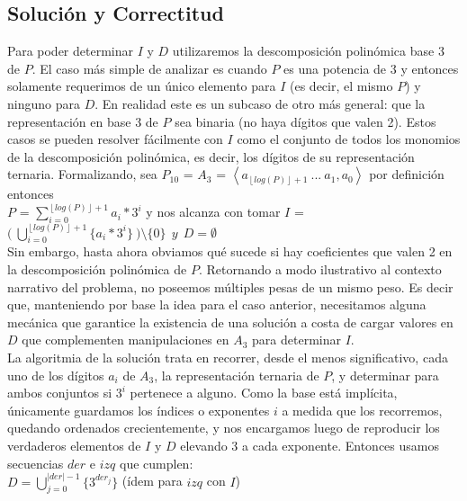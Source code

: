 \subsection{Solución y Correctitud}
	Para poder determinar $I$ y $D$ utilizaremos la descomposición polinómica base 3 de $P$. El caso más simple de analizar es cuando $P$ es una potencia de 3 y entonces solamente requerimos de un único elemento para $I$ (es decir, el mismo $P$) y ninguno para $D$. En realidad este es un subcaso de otro más general: que la representación en base 3 de $P$ sea binaria (no haya dígitos que valen 2). Estos casos se pueden resolver fácilmente con $I$ como el conjunto de todos los monomios de la descomposición polinómica, es decir, los dígitos de su representación ternaria. Formalizando, sea $P_{10}$ = $A_3$ = $\left \langle a_{ \left \lfloor{log(P)}\right \rfloor + 1 } \ ... \ a_1, a_0  \right \rangle$ por definición entonces \\

	$P$ = $\sum_{i = 0}^{\left \lfloor{log(P)}\right \rfloor + 1} a_i*3^{i}$ y nos alcanza con tomar $I$ = $\bigl ( \ \bigcup_{i=0}^{\left \lfloor{log(P)}\right \rfloor + 1} \{a_i*3^{i}\} \ \bigr ) \setminus \{0\} \ \ y \ \ D = \emptyset $
	\\

	Sin embargo, hasta ahora obviamos qué sucede si hay coeficientes que valen 2 en la descomposición polinómica de $P$. Retornando a modo ilustrativo al contexto narrativo del problema, no poseemos múltiples pesas de un mismo peso. Es decir que, manteniendo por base la idea para el caso anterior, necesitamos alguna mecánica que garantice la existencia de una solución a costa de cargar valores en $D$ que complementen manipulaciones en $A_3$ para determinar $I$.
	\\

	La algoritmia de la solución trata en recorrer, desde el menos significativo, cada uno de los dígitos $a_i$ de $A_3$, la representación ternaria de $P$, y determinar para ambos conjuntos si $3^{i}$ pertenece a alguno. Como la base está implícita, únicamente guardamos los índices o exponentes $i$ a medida que los recorremos, quedando ordenados crecientemente, y nos encargamos luego de reproducir los verdaderos elementos de $I$ y $D$ elevando 3 a cada exponente. Entonces usamos secuencias $der$ e $izq$ que cumplen:
	\\

	$D = \bigcup_{j=0}^{|der|-1} \{3^{der_{j}}\}  $   \quad (ídem para $izq$ con $I$)
	\\

